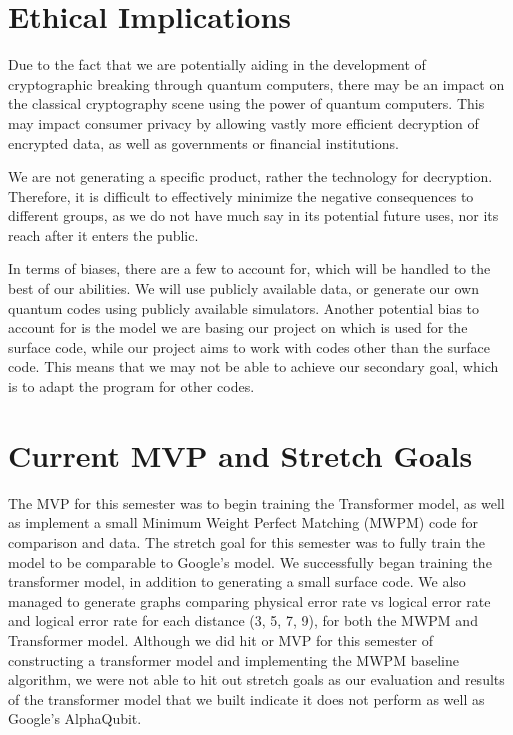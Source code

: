 \documentclass[12pt]{article}
\begin{document}
\section{Ethical Implications}

Due to the fact that we are potentially aiding in the development of cryptographic breaking through quantum computers, there may be an impact on the classical 
cryptography scene using the power of quantum computers. This may impact consumer privacy by allowing vastly more efficient decryption of encrypted data, 
as well as governments or financial institutions. 

We are not generating a specific product, rather the technology for decryption. 
Therefore, it is difficult to effectively minimize the negative consequences to different groups, as we do not have much say in its potential 
future uses, nor its reach after it enters the public. 

In terms of biases, there are a few to account for, which will be handled to the best of our abilities. We will use publicly available data, 
or generate our own quantum codes using publicly available simulators. Another potential bias to account for is the model we are basing our 
project on which is used for the surface code, while our project aims to work with codes other than the surface code. This means that we 
may not be able to achieve our secondary goal, which is to adapt the program for other codes.

\section{Current MVP and Stretch Goals}

The MVP for this semester was to begin training the Transformer model, as well as implement a small Minimum Weight Perfect Matching (MWPM) 
code for comparison and data. The stretch goal for this semester was to fully train the model to be comparable to Google’s model. 
We successfully began training the transformer model, in addition to generating a small surface code. We also managed to generate graphs 
comparing physical error rate vs logical error rate and logical error rate for each distance (3, 5, 7, 9), for both the MWPM and Transformer 
model. Although we did hit or MVP for this semester of constructing a transformer model and implementing the MWPM baseline algorithm, we 
were not able to hit out stretch goals as our evaluation and results of the transformer model that we built indicate it does not perform 
as well as Google’s AlphaQubit.
\end{document}
